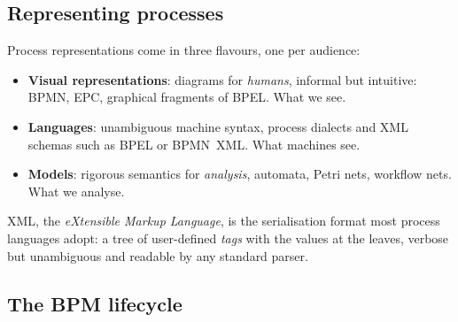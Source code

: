 \subsection{Representing processes}

Process representations come in three flavours, one per audience:

\begin{itemize}
  \item \textbf{Visual representations}: diagrams for \emph{humans}, informal but intuitive: BPMN, EPC, graphical fragments of BPEL. What we see.
  \item \textbf{Languages}: unambiguous machine syntax, process dialects and XML schemas such as BPEL or BPMN~XML. What machines see.
  \item \textbf{Models}: rigorous semantics for \emph{analysis}, automata, Petri nets, workflow nets. What we analyse.
\end{itemize}

XML, the \emph{eXtensible Markup Language}, is the serialisation format most process languages adopt: a tree of user-defined \emph{tags} with the values at the leaves, verbose but unambiguous and readable by any standard parser.

\subsection{The BPM lifecycle}


